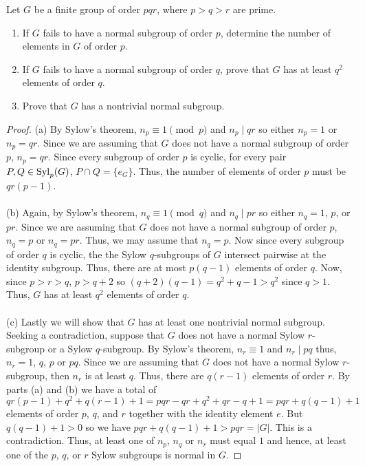 \begin{problem}
Let $G$ be a finite group of order $pqr$, where $p>q>r$ are
prime.
\begin{enumerate}[label=(\alph*)]
\item If $G$ fails to have a normal subgroup of order $p$,
determine the number of elements in $G$ of order $p$.
\item If $G$ fails to have a normal subgroup of order $q$, prove that $G$
  has at least $q^2$ elements of order $q$.
\item Prove that $G$ has a nontrivial normal subgroup.
\end{enumerate}
\end{problem}
\begin{proof}
(a) By Sylow's theorem, $n_p\equiv 1\pmod{p}$ and $n_p\mid qr$ so either
$n_p=1$ or $n_p=qr$. Since we are assuming that $G$  does not have a normal
subgroup of order $p$, $n_p=qr$. Since every subgroup of order $p$ is
cyclic, for every pair $P,Q\in\operatorname{Syl}_p(G)$, $P\cap Q=\{e_G\}$. Thus, the
number of elements of order $p$ must be $qr(p-1)$.
\\\\
(b) Again, by Sylow's theorem, $n_q\equiv 1\pmod{q}$ and $n_q\mid pr$ so
either $n_q=1$, $p$, or $pr$. Since we are assuming that $G$ does not have
a normal subgroup of order $p$, $n_q=p$ or $n_q=pr$. Thus, we may assume
that $n_q=p$. Now since every subgroup of order $q$ is cyclic, the
the Sylow $q$-subgroups of $G$ intersect pairwise at the identity
subgroup. Thus, there are at most $p(q-1)$ elements of order $q$. Now,
since $p>r>q$, $p>q+2$ so $(q+2)(q-1)=q^2+q-1>q^2$ since $q>1$. Thus, $G$ has
at least $q^2$ elements of order $q$.
\\\\
(c) Lastly we will show that $G$ has at least one nontrivial normal
subgroup. Seeking a contradiction, suppose that $G$ does not have a normal
Sylow $r$-subgroup or a Sylow $q$-subgroup. By Sylow's theorem, $n_r\equiv
1$ and $n_r\mid pq$ thus, $n_r=1$, $q$, $p$ or $pq$. Since we are assuming
that $G$ does not have a normal Sylow $r$-subgroup, then $n_r$ is at least
$q$. Thus, there are $q(r-1)$ elements of order $r$. By parts (a) and (b)
we have a total of
\[
qr(p-1)+q^2+q(r-1)+1=pqr-qr+q^2+qr-q+1=pqr+q(q-1)+1
\]
elements of order $p$, $q$, and $r$ together with the identity element
$e$. But $q(q-1)+1>0$ so we have $pqr+q(q-1)+1>pqr=|G|$. This is a
contradiction. Thus, at least one of $n_p$, $n_q$ or $n_r$ must equal $1$
and hence, at least one of the $p$, $q$, or $r$ Sylow subgroups is normal
in $G$.
\end{proof}

